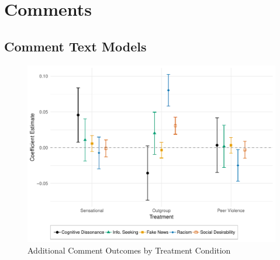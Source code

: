\documentclass[]{article}
\begin{document}
\section{Comments}





\subsection{Comment Text Models}
{




}

\begin{figure}[!htbp]
  \centering
  \caption{Additional Comment Outcomes by Treatment Condition}
  \includegraphics[width=.85\textwidth]{figures/additional_text_oe.pdf}
\end{figure}
\end{document}

